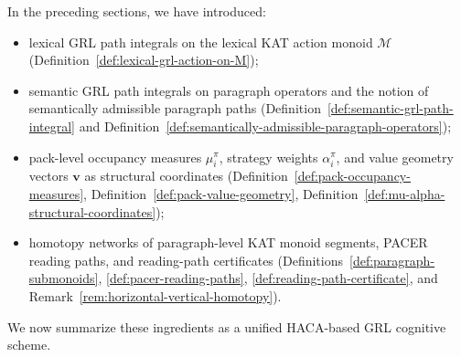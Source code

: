 \documentclass[11pt]{book}
\theoremstyle{plain}
\theoremstyle{definition}
\theoremstyle{remark}
\begin{document}
In the preceding sections, we have introduced:
\begin{itemize}
  \item lexical GRL path integrals on the lexical KAT action monoid
        $\mathcal{M}$ (Definition~\ref{def:lexical-grl-action-on-M});
  \item semantic GRL path integrals on paragraph operators and the
        notion of semantically admissible paragraph paths
        (Definition~\ref{def:semantic-grl-path-integral} and
        Definition~\ref{def:semantically-admissible-paragraph-operators});
  \item pack-level occupancy measures $\mu_i^\pi$, strategy weights
        $\alpha_i^\pi$, and value geometry vectors $\mathbf{v}$ as
        structural coordinates
        (Definition~\ref{def:pack-occupancy-measures},
         Definition~\ref{def:pack-value-geometry},
         Definition~\ref{def:mu-alpha-structural-coordinates});
  \item homotopy networks of paragraph-level KAT monoid segments,
        PACER reading paths, and reading-path certificates
        (Definitions~\ref{def:paragraph-submonoids},
         \ref{def:pacer-reading-paths},
         \ref{def:reading-path-certificate}, and
         Remark~\ref{rem:horizontal-vertical-homotopy}).
\end{itemize}
We now summarize these ingredients as a unified HACA-based GRL
cognitive scheme.
\end{document}
